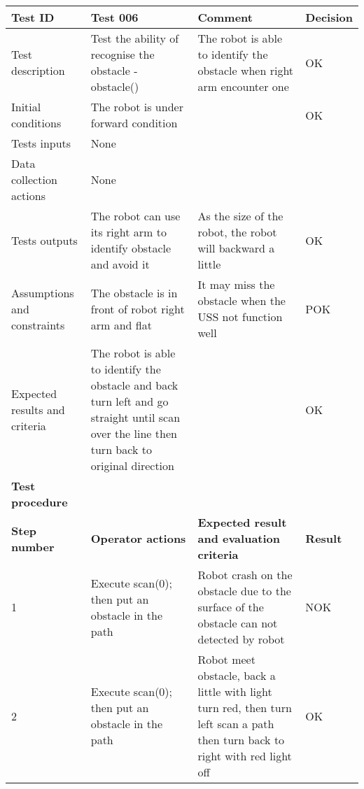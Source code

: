 \documentclass[11pt, a4paper]{article}
\begin{document}
\begin{tabular} 
	 {|p{4cm}|p{4.5cm}|p{4.5cm}|p{1.5cm}|}
\hline
\textbf{Test ID} & \textbf{Test 006} & \textbf{Comment} & \textbf{Decision}\\
\hline
{Test description} & {Test the ability of recognise the obstacle - obstacle()} & {The robot is able to identify the obstacle when right arm \newline encounter one} & {OK}\\
\hline
{Initial conditions} & {The robot is under forward \newline condition} & {} & {OK}\\
\hline
{Tests inputs} & {None} & {} & {}\\
\hline
{Data collection actions} & {None} & {} & {}\\
\hline
{Tests outputs} & {The robot can use its right arm to identify obstacle and avoid it} & {As the size of the robot, the robot will backward a little} & {OK}\\
\hline
{Assumptions and constraints} & {The obstacle is in front of robot right arm and flat} & {It may miss the obstacle when the USS not function well} & {POK}\\
\hline
{Expected results and criteria} & {The robot is able to identify the obstacle and back turn left and go straight until scan over the line then turn back to original direction} & {} & {OK}\\
\hline
\textbf{Test procedure} & \textbf{} & \textbf{} & \textbf{}\\
\hline
\textbf{Step number} & \textbf{Operator actions} & \textbf{Expected result and \newline evaluation criteria} & \textbf{Result}\\
\hline
{1} & {Execute \newline scan(0); \newline then put an obstacle in the path} & {Robot crash on the obstacle due to the surface of the obstacle can not detected by robot} & {NOK}\\
\hline
{2} & {Execute \newline scan(0); \newline then put an obstacle in the path} & {Robot meet obstacle, back a \newline little with light turn red, then turn left scan a path then turn back to right with red light off} & {OK}\\
\hline
\end{tabular}
\newpage
\end{document}
